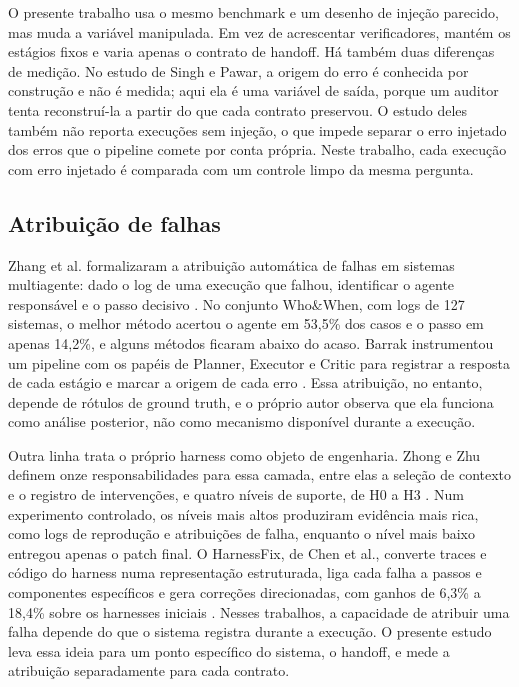 O presente trabalho usa o mesmo benchmark e um desenho de injeção parecido, mas muda a variável manipulada.
Em vez de acrescentar verificadores, mantém os estágios fixos e varia apenas o contrato de handoff.
Há também duas diferenças de medição.
No estudo de Singh e Pawar, a origem do erro é conhecida por construção e não é medida; aqui ela é uma variável de saída, porque um auditor tenta reconstruí-la a partir do que cada contrato preservou.
O estudo deles também não reporta execuções sem injeção, o que impede separar o erro injetado dos erros que o pipeline comete por conta própria. Neste trabalho, cada execução com erro injetado é comparada com um controle limpo da mesma pergunta.

\subsection{Atribuição de falhas}\label{sec:rel-atribuicao}

Zhang et al. formalizaram a atribuição automática de falhas em sistemas multiagente: dado o log de uma execução que falhou, identificar o agente responsável e o passo decisivo \cite{zhang2025which}.
No conjunto Who\&When, com logs de 127 sistemas, o melhor método acertou o agente em 53,5\% dos casos e o passo em apenas 14,2\%, e alguns métodos ficaram abaixo do acaso.
Barrak instrumentou um pipeline com os papéis de Planner, Executor e Critic para registrar a resposta de cada estágio e marcar a origem de cada erro \cite{barrak2025traceability}.
Essa atribuição, no entanto, depende de rótulos de ground truth, e o próprio autor observa que ela funciona como análise posterior, não como mecanismo disponível durante a execução.

Outra linha trata o próprio harness como objeto de engenharia.
Zhong e Zhu definem onze responsabilidades para essa camada, entre elas a seleção de contexto e o registro de intervenções, e quatro níveis de suporte, de H0 a H3 \cite{zhong2026harness}.
Num experimento controlado, os níveis mais altos produziram evidência mais rica, como logs de reprodução e atribuições de falha, enquanto o nível mais baixo entregou apenas o patch final.
O HarnessFix, de Chen et al., converte traces e código do harness numa representação estruturada, liga cada falha a passos e componentes específicos e gera correções direcionadas, com ganhos de 6,3\% a 18,4\% sobre os harnesses iniciais \cite{chen2026failed}.
Nesses trabalhos, a capacidade de atribuir uma falha depende do que o sistema registra durante a execução.
O presente estudo leva essa ideia para um ponto específico do sistema, o handoff, e mede a atribuição separadamente para cada contrato.

